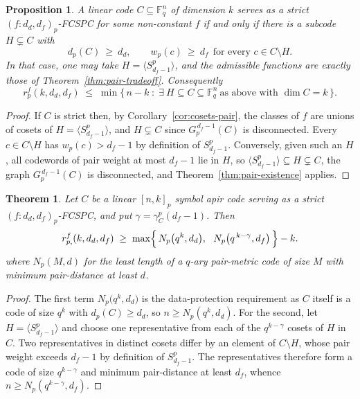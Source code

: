 \documentclass[11pt,draftclsnofoot,journal,onecolumn]{IEEEtran}
\newtheorem{theorem}{Theorem}
\newtheorem{proposition}{Proposition}
\begin{document}
    \begin{proposition}\label{prop:nested}
    A linear code $C\subseteq\mathbb{F}_q^n$ of dimension $k$ serves as a strict $(f:d_d,d_f)_p$-FCSPC for some non-constant $f$ if and only if there is a subcode $H\subsetneq C$ with
    \[
        d_p(C)\ \ge\ d_d,
        \qquad
    w_p(c)\ \ge\ d_f \ \ \text{for every } c\in C\setminus H .
    \]
    In that case, one may take $H=\langle S^p_{d_f-1}\rangle$, and the admissible functions are exactly those of Theorem~\ref{thm:pair-tradeoff}. Consequently
    \[
    r_{p}^f(k,d_d,d_f) \;\leq\; \min\{\,n-k \;:\; \exists\ H\subseteq C\subseteq\mathbb{F}_q^n \ \text{as above with } \dim C=k \,\}.
    \]
    \end{proposition}
    
    \begin{proof}
    If $C$ is strict then, by Corollary~\ref{cor:cosets-pair}, the classes of $f$ are unions of cosets of $H=\langle S^p_{d_f-1}\rangle$, and $H\subsetneq C$ since $G_p^{\,d_f-1}(C)$ is disconnected. Every $c\in C\setminus H$ has $w_p(c)>d_f-1$ by definition of $S^p_{d_f-1}$. Conversely, given such an $H$, all codewords of pair weight at most $d_f-1$ lie in $H$, so $\langle S^p_{d_f-1}\rangle\subseteq H\subsetneq C$, the graph $G_p^{\,d_f-1}(C)$ is disconnected, and Theorem~\ref{thm:pair-existence} applies.
    \end{proof}


    \begin{theorem}\label{thm:quotient-bound}
    Let $C$ be a linear $[n,k]_p$ symbol apir code serving as a strict $(f:d_d,d_f)_p$-FCSPC, and put $\gamma=\gamma_C^p(d_f-1)$. Then
    \[
    r_{p,}^f(k,d_d,d_f) \;\ge\; \max\Bigl\{\,N_p\bigl(q^{k},d_d\bigr),\ \ N_p\bigl(q^{\,k-\gamma},d_f\bigr)\,\Bigr\} - k .
    \]
    where $N_p(M,d)$ for the least length of a $q$-ary pair-metric code of size $M$ with minimum pair-distance at least $d$.
    \end{theorem}
    
    \begin{proof}
    The first term $N_p\bigl(q^{k},d_d\bigr)$ is the data-protection requirement as $C$ itself is a code of size $q^k$ with $d_p(C)\ge d_d$, so $n\ge N_p(q^k,d_d)$. For the second, let $H=\langle S^p_{d_f-1}\rangle$ and choose one representative from each of the $q^{k-\gamma}$ cosets of $H$ in $C$. Two representatives in distinct cosets differ by an element of $C\setminus H$, whose pair weight exceeds $d_f-1$ by definition of $S^p_{d_f-1}$. The representatives therefore form a code of size $q^{k-\gamma}$ and minimum pair-distance at least $d_f$, whence $n\ge N_p(q^{k-\gamma},d_f)$.
    \end{proof}
\end{document}
